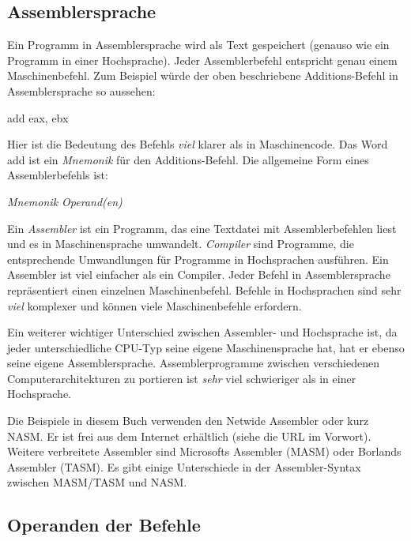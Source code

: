 \subsection{Assemblersprache}

Ein Programm in Assemblersprache wird als Text gespeichert (genauso
wie ein Programm in einer Hochsprache). Jeder Assemblerbefehl
entspricht genau einem Maschinenbefehl. Zum Beispiel w\"{u}rde der oben
beschriebene Additions-Befehl in Assemblersprache so aussehen:
\begin{CodeQuote}
   add eax, ebx
\end{CodeQuote}
Hier ist die Bedeutung des Befehls \emph{viel} klarer als in
Maschinencode. Das Word {\code add} ist ein \emph{Mnemonik}
 f\"{u}r den Additions-Befehl. Die allgemeine Form eines
Assemblerbefehls ist:
\begin{CodeQuote}
  {\em Mnemonik Operand(en)}
\end{CodeQuote}

Ein \emph{Assembler}   ist ein Programm, das eine
Textdatei mit Assemblerbefehlen liest und es in Maschinensprache
umwandelt. \emph{Compiler}  sind Programme, die
entsprechende Umwandlungen f\"{u}r Programme in Hochsprachen ausf\"{u}hren.
Ein Assembler ist viel einfacher als ein Compiler. Jeder Befehl in
Assemblersprache repr\"{a}sentiert einen einzelnen Maschinenbefehl.
Befehle in Hochsprachen sind sehr \emph{viel} komplexer und k\"{o}nnen
viele Maschinenbefehle erfordern.

Ein weiterer wichtiger Unterschied zwischen Assembler- und
Hochsprache ist, da jeder unterschiedliche CPU-Typ seine eigene
Maschinensprache hat, hat er ebenso seine eigene Assemblersprache.
Assemblerprogramme zwischen verschiedenen Computerarchitekturen zu
portieren ist \emph{sehr} viel schwieriger als in einer Hochsprache.

Die Beispiele in diesem Buch verwenden den Netwide Assembler oder
kurz NASM\@.  Er ist frei aus dem Internet
erh\"{a}ltlich (siehe die URL im Vorwort). Weitere verbreitete Assembler
sind Microsofts Assembler (MASM)  oder
Borlands Assembler (TASM).  Es gibt einige
Unterschiede in der As\-semb\-ler-Syn\-tax zwischen MASM/TASM und
NASM\@.

\subsection{Operanden der Befehle}

